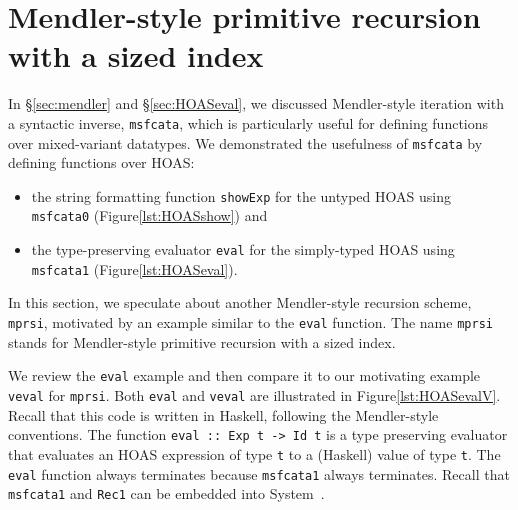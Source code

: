 \section{Mendler-style primitive recursion with a sized index}
\label{sec:mprsi}

In \S\ref{sec:mendler} and \S\ref{sec:HOASeval}, we discussed
Mendler-style iteration with a syntactic inverse, \lstinline{msfcata},
which is particularly useful for defining functions over
mixed-variant datatypes. We demonstrated the usefulness of
\lstinline{msfcata} by defining functions over HOAS:
\begin{itemize}
\item the string formatting function \lstinline{showExp} for
	the untyped HOAS using \lstinline{msfcata0}
	(Figure\;\ref{lst:HOASshow}) and
\item the type-preserving evaluator \lstinline{eval} for
	the simply-typed HOAS using \lstinline{msfcata1}
	(Figure\;\ref{lst:HOASeval}).
\end{itemize}

In this section, we speculate about another Mendler-style recursion scheme,
\lstinline{mprsi}, motivated by an example similar to the \lstinline{eval}
function. The name \lstinline{mprsi} stands for
Mendler-style primitive recursion with a sized index.

\begin{figure}

\vspace*{-3ex}
\end{figure}

We review the \lstinline{eval} example and then compare
it to our motivating example \lstinline{veval} for \lstinline{mprsi}.
Both \lstinline{eval} and \lstinline{veval} are illustrated
in Figure\;\ref{lst:HOASevalV}. Recall that this code is written in Haskell,
following the Mendler-style conventions.
The function \lstinline{eval :: Exp t -> Id t} is
a type preserving evaluator that evaluates an HOAS expression of type
\lstinline{t} to a (Haskell) value of type \lstinline{t}.
The \lstinline{eval} function always terminates because
\lstinline{msfcata1} always terminates. Recall that \lstinline{msfcata1}
and \lstinline{Rec1} can be embedded into System~\Fw.

